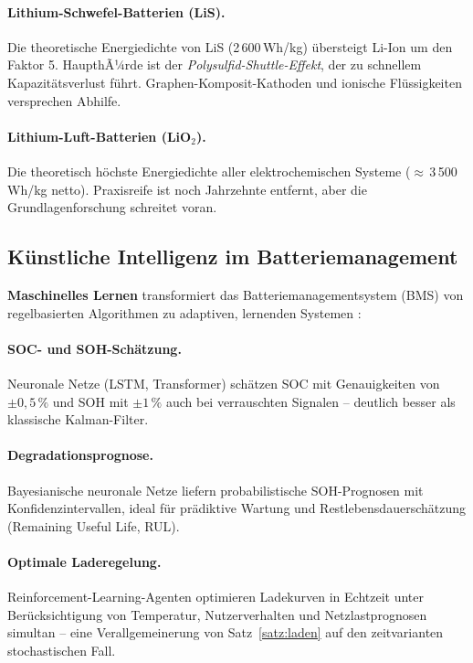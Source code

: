 ﻿\documentclass[a4paper,12pt]{article}
\theoremstyle{definition}
\begin{document}
\paragraph{Lithium-Schwefel-Batterien (LiS).}
Die theoretische Energiedichte von LiS (2\,600\,Wh/kg) \"ubersteigt Li-Ion
um den Faktor 5. HaupthÃ¼rde ist der \emph{Polysulfid-Shuttle-Effekt},
der zu schnellem Kapazit\"atsverlust f\"uhrt. Graphen-Komposit-Kathoden
und ionische Fl\"ussigkeiten versprechen Abhilfe.

\paragraph{Lithium-Luft-Batterien (LiO$_2$).}
Die theoretisch h\"ochste Energiedichte aller elektrochemischen Systeme
($\approx$\,3\,500\,Wh/kg netto). Praxisreife ist noch Jahrzehnte entfernt,
aber die Grundlagenforschung schreitet voran.

\subsection{K\"unstliche Intelligenz im Batteriemanagement}

\textbf{Maschinelles Lernen} transformiert das Batteriemanagementsystem (BMS)
von regelbasierten Algorithmen zu adaptiven, lernenden Systemen \cite{Liu2019}:

\paragraph{SOC- und SOH-Sch\"atzung.}
Neuronale Netze (LSTM, Transformer) sch\"atzen SOC mit Genauigkeiten von
$\pm 0{,}5\,\%$ und SOH mit $\pm 1\,\%$ auch bei verrauschten Signalen --
deutlich besser als klassische Kalman-Filter.

\paragraph{Degradationsprognose.}
Bayesianische neuronale Netze liefern probabilistische SOH-Prognosen
mit Konfidenzintervallen, ideal f\"ur pr\"adiktive Wartung und
Restlebensdauersch\"atzung (Remaining Useful Life, RUL).

\paragraph{Optimale Laderegelung.}
Reinforcement-Learning-Agenten optimieren Ladekurven in Echtzeit unter
Ber\"ucksichtigung von Temperatur, Nutzerverhalten und Netzlastprognosen
simultan -- eine Verallgemeinerung von Satz~\ref{satz:laden} auf den
zeitvarianten stochastischen Fall.
\end{document}
